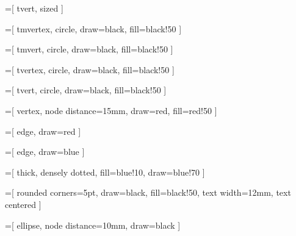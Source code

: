 =[
    tvert,
    sized
]

=[
    tmvertex,
	circle,
	draw=black,
	fill=black!50
]

=[
    tmvert,
	circle,
	draw=black,
	fill=black!50
]

=[
    tvertex,
	circle,
	draw=black,
	fill=black!50
]

=[
    tvert,
	circle,
	draw=black,
	fill=black!50
]

=[
	vertex,
	node distance=15mm,
	draw=red,
	fill=red!50
]

=[
	edge,
	draw=red
]

=[
	edge,
	draw=blue
]

=[
	thick, %
	densely dotted,
	fill=blue!10,
	draw=blue!70
]

=[
    rounded corners=5pt,
    draw=black,
    fill=black!50,
    text width=12mm,
    text centered
]

=[
    ellipse,
    node distance=10mm,
    draw=black
]

\newcommand{\base}[4]{
    \draw[->] (0,0) to (0, #1);
    \draw[->] (0,0) to (#2, 0);
    
    \node at (0, #1+2) {#3};
    \node at (#2 + 2, -2) {#4};
}

\newenvironment{ordo}[4][12]
{
    \begin{center}
    \begin{tikzpicture}[>=latex]
        \pgfmathparse{#3/#4 * #1} \let\xpas\pgfmathresult
        \pgfmathparse{int(#4/#3)} \let\nbpas\pgfmathresult
        \pgfmathparse{\xpas/#3} \let\unitxpas\pgfmathresult
        
        \draw[thick] (#1+1,0) -- (0,0) -- (0,#2) -- (#1+1,#2);

        \node[below] at (0, 0) {$0$};

        \foreach \x in {1,...,\nbpas}{
            \pgfmathparse{\x * \xpas} \let\abscisse\pgfmathresult
            \pgfmathparse{int(\x * #3)} \let\xlabel\pgfmathresult

            \node[below] at (\abscisse, 0) {$\xlabel$};
            \draw[dotted] (\abscisse,0) to (\abscisse,#2);
        }

        \foreach \y in {1,...,#2}{
            \pgfmathparse{\y - 0.5} \let\ordlabel\pgfmathresult

            \node[left] at (0, \ordlabel) {$M_\y$};
            \draw[dotted] (0, \y) to (#1+1, \y);
        }
}
{\end{tikzpicture}\end{center}}

